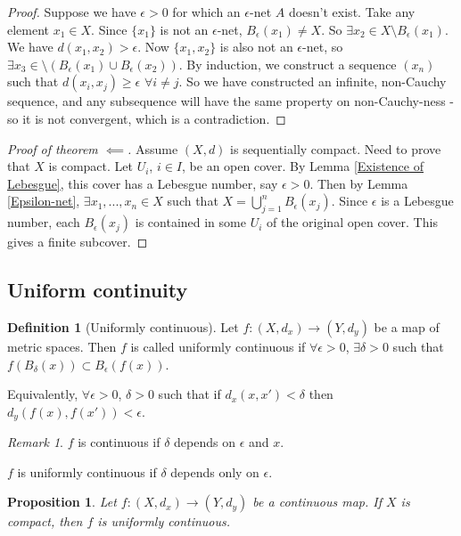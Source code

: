 \documentclass{article}
\theoremstyle{definition}
\newtheorem{defn}{Definition}[section]
\theoremstyle{plain}%
\newtheorem{prop}[thm]{Proposition}
\theoremstyle{remark}
\newtheorem*{rem}{Remark}
\newcommand{\union}{\cup}
\newcommand{\Union}{\bigcup}
\begin{document}
\begin{proof}
    Suppose we have $\epsilon > 0$ for which an $\epsilon$-net $A$ doesn't exist. Take any element $x_1 \in X$. Since $\{x_1\}$ is not an $\epsilon$-net, $B_\epsilon(x_1) \ne X$. So $\exists x_2 \in X \setminus B_\epsilon(x_1)$. We have $d(x_1, x_2) > \epsilon$. Now $\{x_1, x_2\}$ is also not an $\epsilon$-net, so $\exists x_3 \in  \setminus (B_\epsilon(x_1) \union B_\epsilon(x_2))$. By induction, we construct a sequence $(x_n)$ such that $d(x_i, x_j) \ge \epsilon$ $\forall i \ne j$. So we have constructed an infinite, non-Cauchy sequence, and any subsequence will have the same property on non-Cauchy-ness - so it is not convergent, which is a contradiction.
\end{proof}

\begin{proof}[Proof of theorem $\impliedby$]
    Assume $(X,d)$ is sequentially compact. Need to prove that $X$ is compact. Let $U_i$, $i \in I$, be an open cover. By Lemma \ref{Existence of Lebesgue}, this cover has a Lebesgue number, say $\epsilon > 0$. Then by Lemma \ref{Epsilon-net}, $\exists x_1, ..., x_n \in X$ such that $X = \Union_{j=1}^n B_\epsilon(x_j)$. Since $\epsilon$ is a Lebesgue number, each $B_\epsilon(x_j)$ is contained in some $U_i$ of the original open cover. This gives a finite subcover.
\end{proof}

\subsection{Uniform continuity}

\begin{defn}[Uniformly continuous]
    Let $f: (X, d_x) \to (Y, d_y)$ be a map of metric spaces. Then $f$ is called uniformly continuous if $\forall \epsilon > 0$, $\exists \delta > 0$ such that $f(B_{\delta}(x)) \subset B_\epsilon(f(x))$.
    
    Equivalently, $\forall \epsilon > 0$, $\delta > 0$ such that if $d_x(x, x') < \delta$ then $d_y(f(x), f(x'))< \epsilon$.
\end{defn}

\begin{rem}
    $f$ is continuous if $\delta$ depends on $\epsilon$ and $x$.
    
    $f$ is uniformly continuous if $\delta$ depends only on $\epsilon$.
\end{rem}

\begin{prop}
    Let $f: (X, d_x) \to (Y, d_y)$ be a continuous map. If $X$ is compact, then $f$ is uniformly continuous.
\end{prop}
\end{document}
